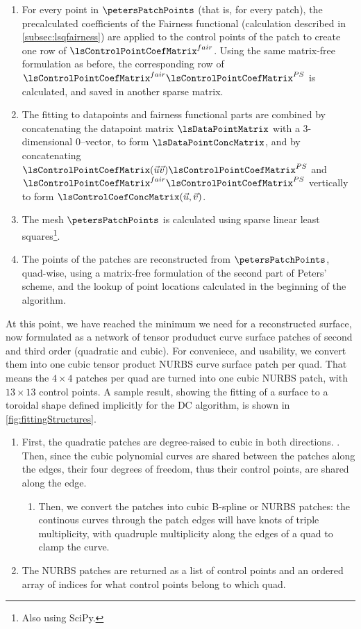 \begin{enumerate}
\begin{enumerate}[label=(\alph*)]
\end{enumerate}
\item For every point in $\petersPatchPoints$ (that is, for every \Bez patch), the precalculated coefficients of the Fairness functional (calculation described in \autoref{subsec:lsqfairness}) are applied to the \Bez control points of the patch to create one row of $\lsControlPointCoefMatrix^{fair}$. Using the same matrix-free formulation as before, the corresponding row of $\lsControlPointCoefMatrix^{fair}\lsControlPointCoefMatrix^{PS}$ is calculated, and saved in another sparse matrix.
\item The fitting to datapoints and fairness functional parts are combined by concatenating the datapoint matrix $\lsDataPointMatrix$ with a 3-dimensional $0$--vector, to form $\lsDataPointConcMatrix$, and by concatenating $\lsControlPointCoefMatrix(\vec{u}\vec{v})\lsControlPointCoefMatrix^{PS}$ and  $\lsControlPointCoefMatrix^{fair}\lsControlPointCoefMatrix^{PS}$ vertically to form $\lsControlCoefConcMatrix(\vec{u},\vec{v})$.
\item The mesh $\petersPatchPoints$ is calculated using sparse linear least squares\footnote{Also using SciPy.}.
\item The \Bez points of the patches are reconstructed from $\petersPatchPoints$, quad-wise, using a matrix-free formulation of the second part of Peters' scheme, and the lookup of point locations calculated in the beginning of the algorithm.
\end{enumerate}
At this point, we have reached the minimum we need for a reconstructed surface, now formulated as a network of tensor produduct \Bez curve surface patches of second and third order (quadratic and cubic). For conveniece, and usability, we convert them into one cubic tensor product NURBS curve surface patch per quad. That means the $4\times4$ \Bez patches per quad are turned into one cubic NURBS patch, with $13\times13$ control points. 
A sample result, showing the fitting of a surface to a toroidal shape defined implicitly for the \acs{DC} algorithm, is shown in \autoref{fig:fittingStructures}. 
\begin{enumerate}[resume]
\item First, the quadratic \Bez patches are degree-raised to cubic in both directions. . Then, since the cubic polynomial curves are shared between the patches along the edges, their four degrees of freedom, thus their control points, are shared along the edge.
\begin{enumerate} [label=(\alph*)]
\item Then, we convert the \Bez patches into cubic B-spline or NURBS patches: the continous curves through the \Bez patch edges will have knots of triple multiplicity, with quadruple multiplicity along the edges of a quad to clamp the curve. 
\end{enumerate}
\item The NURBS patches are returned as a list of control points and an ordered array of indices for what control points belong to which quad.
\end{enumerate}
